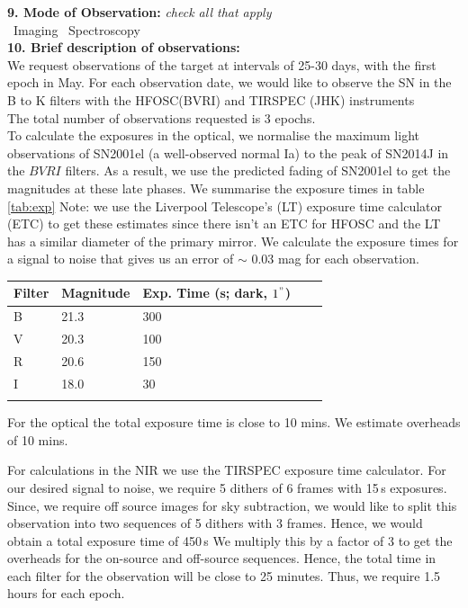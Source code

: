 \documentclass[11pt]{article}
\begin{document}
{\bf 9. Mode of Observation:} {\sl check all that apply}\\ 
%
\YES~Imaging
\NO~Spectroscopy
\\

{\bf 10. Brief description of observations: } \\
We request observations of the target at intervals of 25-30 days, with the first epoch in May. For each observation date, we would like to observe the SN in the  B to K filters with the HFOSC(BVRI) and TIRSPEC (JHK) instruments  \\

The total number of observations requested is 3 epochs.\\

To calculate the exposures in the optical, we normalise the maximum light observations of SN2001el (a well-observed normal Ia) to the peak of SN2014J in the $BVRI$ filters. As a result, we use the predicted fading of SN2001el to get the magnitudes at these late phases. 
We summarise the exposure times in  table \ref{tab:exp}
Note: we use the Liverpool Telescope's (LT) exposure time calculator (ETC) to get these estimates since there isn't an ETC for HFOSC and the LT has a similar diameter of the primary mirror. 
We calculate the exposure times for a signal to noise that gives us an error of $\sim$ 0.03 mag for each observation. 
\begin{tabular}{lllll|}
Filter & Magnitude & Exp. Time (s; dark, $1^{"}$)  \\%
\hline
B	& 21.3  & 300 \\%
V	& 20.3 & 100 \\%
R	&  20.6 & 150 \\	%
I	&   18.0  & 30 \\%
\hline
\label{tab:exp}
\end{tabular}
\newpage
For the optical the total exposure time is close to 10 mins. We estimate overheads of 10 mins. 

For  calculations in the NIR we use the TIRSPEC exposure time calculator. For our desired signal to noise, we require 5 dithers of 6 frames with 15\,s exposures. Since, we require off source images for sky subtraction, we would like to split this observation into two sequences of 5 dithers with 3 frames. 
Hence, we would obtain a total exposure time of 450\,s 
We multiply this by a factor of 3 to get the overheads for the on-source and off-source sequences. Hence, the total time in each filter for the observation will be close to 25 minutes. Thus, we require 1.5 hours for each epoch.
\end{document}
